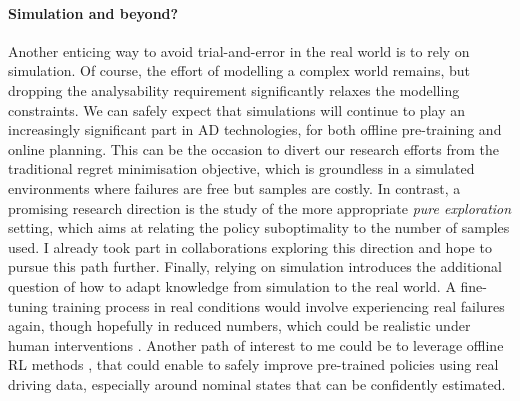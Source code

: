 \paragraph{Simulation and beyond?}

Another enticing way to avoid trial-and-error in the real world is to rely on simulation. Of course, the effort of modelling a complex world remains, but dropping the analysability requirement significantly relaxes the modelling constraints. We can safely expect that simulations will continue to play an increasingly significant part in \gls{AD} technologies, for both offline pre-training and online planning. This can be the occasion to divert our research efforts from the traditional regret minimisation objective, which is groundless in a simulated environments where failures are free but samples are costly. In contrast, a promising research direction is the study of the more appropriate \emph{pure exploration} setting, which aims at relating the policy suboptimality to the number of samples used. I already took part in collaborations exploring this direction \citep{Jonsson2020planning,Kaufmann2020adaptive,Menard2020Fast} and hope to pursue this path further. 
Finally, relying on simulation introduces the additional question of how to adapt knowledge from simulation to the real world. A fine-tuning training process in real conditions would involve experiencing real failures again, though hopefully in reduced numbers, which could be realistic under human interventions \citep{Saunders2018,Kendall2019}. Another path of interest to me could be to leverage offline \gls{RL} methods \citep{Thomas2015,Laroche2019}, that could enable to safely improve pre-trained policies using real driving data, especially around nominal states that can be confidently estimated.
